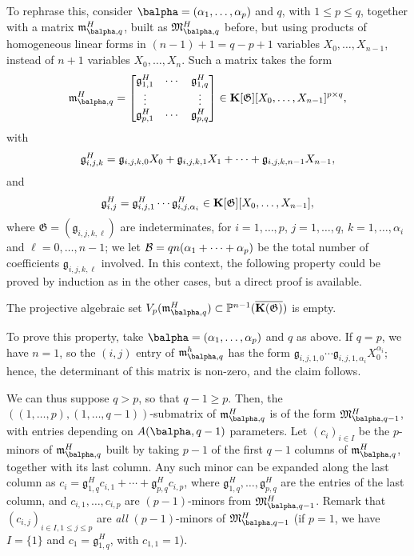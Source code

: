 \documentclass[12pt]{article}
\begin{document}
To rephrase this, consider $\balpha=(\alpha_1,\dots,\alpha_p)$ and
$q$, with $1 \le p \le q$, together with a matrix
$\mathfrak{m}^H_{\balpha,q}$, built as $\mathfrak{M}^H_{\balpha,q}$
before, but using products of homogeneous linear forms in $(n-1)+1=q-p+1$
variables $X_0,\dots,X_{n-1}$, instead of $n+1$ variables
$X_0,\dots,X_n$. Such a matrix takes the form
\begin{align}\label{eq:matM2}
\mathfrak{m}^H_{\balpha,q}=\left [\begin{matrix}
\mathfrak{g}^H_{1,1} & \cdots & \mathfrak{g}^H_{1,q}\\
 \vdots & & \vdots\\
\mathfrak{g}^H_{p,1} & \cdots & \mathfrak{g}^H_{p,q}
  \end{matrix}\right ]\in \KK[\mathfrak{G}][X_0,\dots,X_{n-1}]^{p\times q},
\end{align}
with 
$$\mathfrak{g}^H_{i,j,k} = \frak{g}_{i,j,k,0}X_0 + \frak{g}_{i,j,k,1} X_1 +\cdots + \frak{g}_{i,j,k,n-1} X_{n-1},$$
and
$$\mathfrak{g}^H_{i,j} = \mathfrak{g}^H_{i,j,1} \cdots
\mathfrak{g}^H_{i,j,\alpha_i} \in \mathbf{K}[\mathfrak{G}][X_0,\dots,X_{n-1}],$$
where $\mathfrak{G}=(\mathfrak{g}_{i,j,k,\ell})$ are indeterminates,
for $i=1,\dots,p$, $j=1,\dots,q$, $k=1,\dots,\alpha_i$ and
$\ell=0,\dots,n-1$; we let ${\cal B}=q n (\alpha_1+\cdots +\alpha_p)$ be the total
number of coefficients $\mathfrak{g}_{i,j,k,\ell}$ involved. In this context, the
following property could be proved by induction as in the other cases,
but a direct proof is available.

\begin{description}[leftmargin=*]
\item[$\assI_3(\balpha,q).$] The projective algebraic set
  $V_p(\mathfrak{m}^H_{\balpha,q}) \subset \P^{n-1}(\KKCbar)$ is empty.
\end{description}
To prove this property, take $\balpha=(\alpha_1,\dots,\alpha_p)$ and
$q$ as above. If $q=p$, we have $n=1$, so the $(i,j)$ entry of
$\mathfrak{m}^h_{\balpha,q}$ has the form
$\mathfrak{g}_{i,j,1,0}\cdots\mathfrak{g}_{i,j,1,\alpha_i}
X_0^{\alpha_i}$; hence, the determinant of this matrix is non-zero,
and the claim follows.

We can thus suppose $q > p$, so that $q-1 \ge p$.  Then, the
$((1,\dots,p),(1,\dots,q-1))$-submatrix of $\mathfrak{m}^H_{\balpha,q}$ is
of the form $\mathfrak{M}^H_{\balpha,q-1}$, with entries depending on
$A(\balpha,q-1)$ parameters.  Let $(c_i)_{i \in I}$ be the $p$-minors
of $\mathfrak{m}^H_{\balpha,q}$ built by taking $p-1$ of the first $q-1$
columns of $\mathfrak{m}^H_{\balpha,q}$, together with its last column.
Any such minor can be expanded along the last column as $c_i =
\mathfrak{g}^H_{1,q} c_{i,1} + \cdots + \mathfrak{g}^H_{p,q}
c_{i,p}$, where $\mathfrak{g}^H_{1,q},\dots,\mathfrak{g}^H_{p,q}$ are
the entries of the last column, and $c_{i,1},\dots,c_{i,p}$
are $(p-1)$-minors from $\mathfrak{M}^H_{\balpha,q-1}$. Remark that
$(c_{i,j})_{i \in I, 1 \le j \le p}$ are {\em all} $(p-1)$-minors
of $\mathfrak{M}^H_{\balpha,q-1}$ (if $p=1$, we have $I=\{1\}$ and
$c_1=\mathfrak{g}^H_{1,q}$, with $c_{1,1}=1$).
\end{document}
